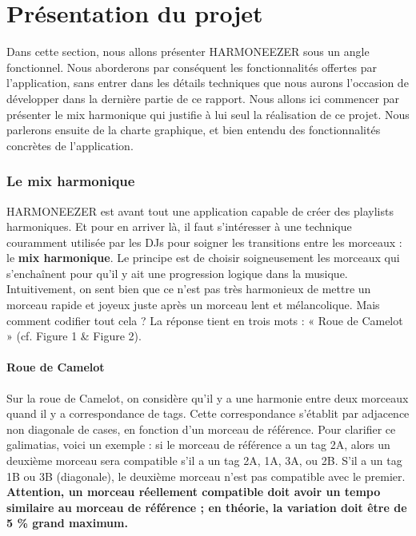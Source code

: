 \documentclass[a4paper,12pt]{article}
\begin{document}
\part{Présentation du projet}

Dans cette section, nous allons présenter HARMONEEZER sous un angle fonctionnel. Nous aborderons par conséquent les fonctionnalités offertes par l'application, sans entrer dans les détails techniques que nous aurons l'occasion de développer dans la dernière partie de ce rapport. Nous allons ici commencer par présenter le mix harmonique qui justifie à lui seul la réalisation de ce projet. Nous parlerons ensuite de la charte graphique, et bien entendu des fonctionnalités concrètes de l'application.

\section{Le mix harmonique}

HARMONEEZER est avant tout une application capable de créer des playlists harmoniques. Et pour en arriver là, il faut s'intéresser à une technique couramment utilisée par les DJs pour soigner les transitions entre les morceaux : le \textbf{mix harmonique}. Le principe est de choisir soigneusement les morceaux qui s'enchaînent pour qu'il y ait une progression logique dans la musique. Intuitivement, on sent bien que ce n'est pas très harmonieux de mettre un morceau rapide et joyeux juste après un morceau lent et mélancolique. Mais comment codifier tout cela ? La réponse tient en trois mots : « Roue de Camelot » (cf. Figure 1 \& Figure 2).

\subsection{Roue de Camelot}

Sur la roue de Camelot, on considère qu'il y a une harmonie entre deux morceaux quand il y a correspondance de tags. Cette correspondance s'établit par adjacence non diagonale de cases, en fonction d'un morceau de référence. Pour clarifier ce galimatias, voici un exemple : si le morceau de référence a un tag 2A, alors un deuxième morceau sera compatible s'il a un tag 2A, 1A, 3A, ou 2B. S'il a un tag 1B ou 3B (diagonale), le deuxième morceau n'est pas compatible avec le premier. \textbf{Attention, un morceau réellement compatible doit avoir un tempo similaire au morceau de référence ; en théorie, la variation doit être de 5 \% grand maximum.}
\end{document}
